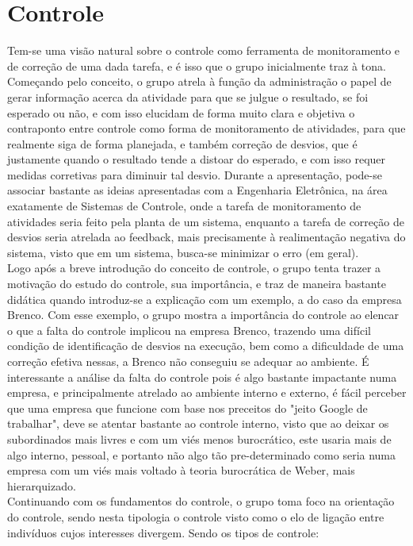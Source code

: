 \documentclass[oneside]{book}
\newcommand\tab[1][1cm]{\hspace*{#1}}
\theoremstyle{definition}
\begin{document}
            \chapter{Controle}
            \tab Tem-se uma visão natural sobre o controle como ferramenta de monitoramento e de correção de uma dada tarefa, e é isso que o grupo inicialmente traz à tona. Começando pelo conceito, o grupo atrela à função da administração o papel de gerar informação acerca da atividade para que se julgue o resultado, se foi esperado ou não, e com isso elucidam de forma muito clara e objetiva o contraponto entre controle como forma de monitoramento de atividades, para que realmente siga de forma planejada, e também correção de desvios, que é justamente quando o resultado tende a distoar do esperado, e com isso requer medidas corretivas para diminuir tal desvio. Durante a apresentação, pode-se associar bastante as ideias apresentadas com a Engenharia Eletrônica, na área exatamente de Sistemas de Controle, onde a tarefa de monitoramento de atividades seria feito pela planta de um sistema, enquanto a tarefa de correção de desvios seria atrelada ao feedback, mais precisamente à realimentação negativa do sistema, visto que em um sistema, busca-se minimizar o erro (em geral). \\
            \tab Logo após a breve introdução do conceito de controle, o grupo tenta trazer a motivação do estudo do controle, sua importância, e traz de maneira bastante didática quando introduz-se a explicação com um exemplo, a do caso da empresa Brenco. Com esse exemplo, o grupo mostra a importância do controle ao elencar o que a falta do controle implicou na empresa Brenco, trazendo uma difícil condição de identificação de desvios na execução, bem como a dificuldade de uma correção efetiva nessas, a Brenco não conseguiu se adequar ao ambiente. É interessante a análise da falta do controle pois é algo bastante impactante numa empresa, e principalmente atrelado ao ambiente interno e externo, é fácil perceber que uma empresa que funcione com base nos preceitos do "jeito Google de trabalhar", deve se atentar bastante ao controle interno, visto que ao deixar os subordinados mais livres e com um viés menos burocrático, este usaria mais de algo interno, pessoal, e portanto não algo tão pre-determinado como seria numa empresa com um viés mais voltado à teoria burocrática de Weber, mais hierarquizado. \\
            \tab Continuando com os fundamentos do controle, o grupo toma foco na orientação do controle, sendo nesta tipologia o controle visto como o elo de ligação entre indivíduos cujos interesses divergem. Sendo os tipos de controle:
\end{document}
